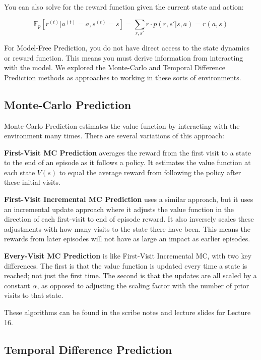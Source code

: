 \documentclass[11pt]{article}
\begin{document}
You can also solve for the reward function given the current state and action:

\begin{equation}
    \mathbb{E}_p[r^{(t)} | a^{(t)}=a, s^{(t)}=s] = \sum\limits_{r, s'} r \cdot p(r,s'|s,a) = r(a,s)
\end{equation}

For Model-Free Prediction, you do not have direct access to the state dynamics or reward function. This means you must derive information from interacting with the model. We explored the Monte-Carlo and Temporal Difference Prediction methods as approaches to working in these sorts of environments. 

\subsection{Monte-Carlo Prediction}

Monte-Carlo Prediction estimates the value function by interacting with the environment many times. There are several variations of this approach:

\textbf{First-Visit MC Prediction} averages the reward from the first visit to a state to the end of an episode as it follows a policy. It estimates the value function at each state $V(s)$ to equal the average reward from following the policy after these initial visits. 

\textbf{First-Visit Incremental MC Prediction} uses a similar approach, but it uses an incremental update approach where it adjusts the value function in the direction of each first-visit to end of episode reward. It also inversely scales these adjustments with how many visits to the state there have been. This means the rewards from later episodes will not have as large an impact as earlier episodes.

\textbf{Every-Visit MC Prediction} is like First-Visit Incremental MC, with two key differences. The first is that the value function is updated every time a state is reached; not just the first time. The second is that the updates are all scaled by a constant $\alpha$, as opposed to adjusting the scaling factor with the number of prior visits to that state.

These algorithms can be found in the scribe notes and lecture slides for Lecture 16.


\subsection{Temporal Difference Prediction}
\end{document}
